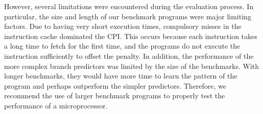 \documentclass[conference,hidelinks]{IEEEtran}
\begin{document}
However, several limitations were encountered during the evaluation process. In particular, the size and length of our benchmark programs were major limiting factors. Due to having very short execution times, compulsory misses in the instruction cache dominated the CPI. This occurs because each instruction takes a long time to fetch for the first time, and the programs do not execute the instruction sufficiently to offset the penalty. In addition, the performance of the more complex branch predictors was limited by the size of the benchmarks. With longer benchmarks, they would have more time to learn the pattern of the program and perhaps outperform the simpler predictors. Therefore, we recommend the use of larger benchmark programs to properly test the performance of a microprocessor.

{}

\end{document}
